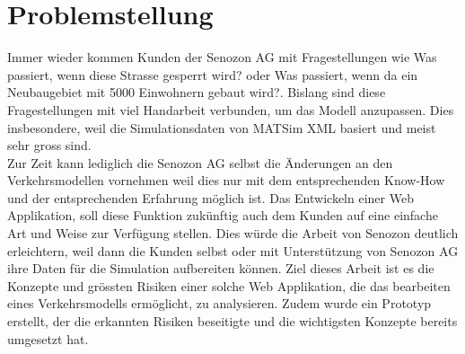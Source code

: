 \chapter{Problemstellung}
Immer wieder kommen Kunden der Senozon AG mit Fragestellungen wie \glqq{}Was passiert, wenn diese Strasse gesperrt wird?\grqq{} oder \glqq{}Was passiert, wenn da ein Neubaugebiet mit 5000 Einwohnern gebaut wird?\grqq{}. Bislang sind diese Fragestellungen mit viel Handarbeit verbunden, um das Modell anzupassen. Dies insbesondere, weil die Simulationsdaten von MATSim XML basiert und meist sehr gross sind.\\
Zur Zeit kann lediglich die Senozon AG selbst die Änderungen an den Verkehrsmodellen vornehmen weil dies nur mit dem entsprechenden Know-How und der entsprechenden Erfahrung möglich ist. Das Entwickeln einer Web Applikation, soll diese Funktion zukünftig auch dem Kunden auf eine einfache Art und Weise zur Verfügung stellen. Dies würde die Arbeit von Senozon deutlich erleichtern, weil dann die Kunden selbst oder mit Unterstützung von Senozon AG ihre Daten für die Simulation aufbereiten können. Ziel dieses Arbeit ist es die Konzepte und grössten Risiken einer solche Web Applikation, die das bearbeiten eines Verkehrsmodells ermöglicht, zu analysieren. Zudem wurde ein Prototyp erstellt, der die erkannten Risiken beseitigte und die wichtigsten Konzepte bereits umgesetzt hat.\\
